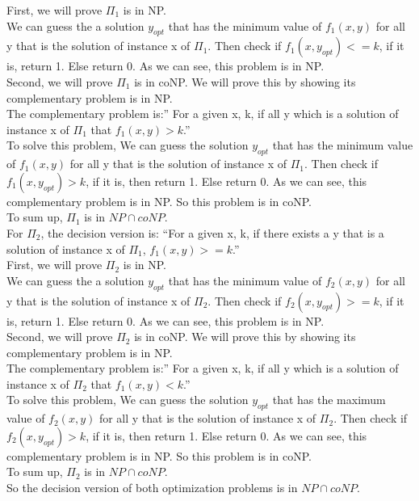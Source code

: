 \documentclass[12pt]{article}
\begin{document}
First, we will prove $\Pi_1$ is in NP. \\

We can guess the a solution $y_{opt}$ that has the minimum value of
$f_1(x,y)$ for all y that is the solution of instance x of
$\Pi_1$. Then check if $f_1(x, y_{opt}) <= k$, if it is, return
1. Else return 0. As we can see, this problem is in NP. \\

Second, we will prove $\Pi_1$ is in coNP. We will prove this by
showing its complementary problem is in NP. \\

The complementary problem is:'' For a given x, k, if all y which is a
solution of instance x of $\Pi_1$ that $f_1(x, y) > k$.'' \\

To solve this problem, We can guess the solution $y_{opt}$ that has
the minimum value of $f_1(x,y)$ for all y that is the solution of
instance x of $\Pi_1$. Then check if $f_1(x, y_{opt}) > k$, if it is,
then return 1. Else return 0. As we can see, this complementary
problem is in NP. So this problem is in coNP. \\

To sum up, $\Pi_1$ is in $NP \cap coNP$. \\

For $\Pi_2$, the decision version is: ``For a given x, k, if there
exists a y that is a solution of instance x of $\Pi_1$,  $f_1(x,y) >=
k$.'' \\

First, we will prove $\Pi_2$ is in NP. \\

We can guess the a solution $y_{opt}$ that has the minimum value of
$f_2(x,y)$ for all y that is the solution of instance x of
$\Pi_2$. Then check if $f_2(x, y_{opt}) >= k$, if it is, return
1. Else return 0. As we can see, this problem is in NP. \\

Second, we will prove $\Pi_2$ is in coNP. We will prove this by
showing its complementary problem is in NP. \\

The complementary problem is:'' For a given x, k, if all y which is a
solution of instance x of $\Pi_2$ that $f_1(x, y) < k$.'' \\

To solve this problem, We can guess the solution $y_{opt}$ that has
the maximum value of $f_2(x,y)$ for all y that is the solution of
instance x of $\Pi_2$. Then check if $f_2(x, y_{opt}) > k$, if it is,
then return 1. Else return 0. As we can see, this complementary
problem is in NP. So this problem is in coNP. \\

To sum up, $\Pi_2$ is in $NP \cap coNP$. \\

So the decision version of both optimization problems is in $NP \cap
coNP$. \\
\end{document}
